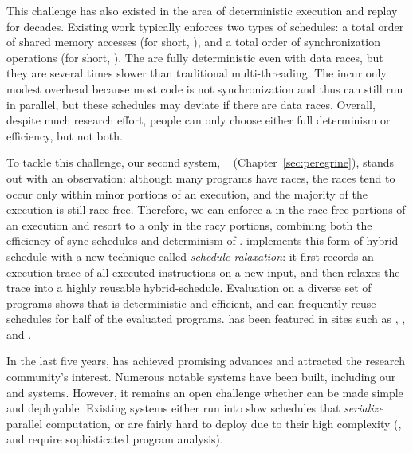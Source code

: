  This challenge has also existed in the area of deterministic
execution and replay for decades. Existing work typically enforces two types of
schedules: a total order of shared memory accesses (for short, \memsched), and a
total order of synchronization operations (for short, \syncsched). The
\memscheds are fully deterministic even with data races, but they are several
times slower than traditional multi-threading. The \syncscheds incur only modest
overhead because most code is not synchronization and thus can still run in
parallel, but these schedules may deviate if there are data races. Overall,
despite much research effort, people can only choose either full determinism or
efficiency, but not both.

To tackle this challenge, our second \smt system,
\peregrine~\cite{peregrine:sosp11} (Chapter~\ref{sec:peregrine}), stands out
with an observation: although many programs have races, the races tend to occur
only within minor portions of an execution, and the majority of the execution is
still race-free. Therefore, we can enforce a \syncscheds in the race-free
portions of an execution and resort to a \memsched only in the racy portions,
combining both the efficiency of sync-schedules and determinism of \memscheds. 
\peregrine implements this form of hybrid-schedule with a new technique called
\emph{schedule ralaxation}: it first records an execution trace of
all executed instructions on a new input, and then relaxes the trace into a
highly reusable hybrid-schedule. Evaluation on a diverse set of programs shows
that \peregrine is deterministic and efficient, and can frequently reuse
schedules for half of the evaluated programs. \peregrine has been featured in
sites such as \acmtechnews, \tgdaily, and \physorg.

 In the last five
years, \smt has achieved promising advances and attracted the research
community's interest. Numerous notable \smt systems have been built, including
our \tern and \peregrine systems. However, it remains an open challenge whether
\smt can be made simple and deployable. Existing \smt systems either run into
slow schedules that \emph{serialize} parallel computation, or are fairly hard to
deploy due to their high complexity (\eg, \tern and \peregrine require
sophisticated program analysis).

